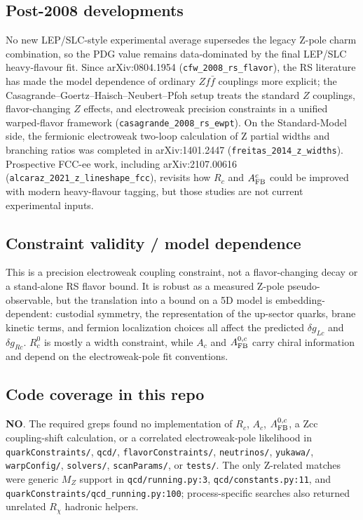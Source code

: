 \subsection*{Post-2008 developments}
No new LEP/SLC-style experimental average supersedes the legacy Z-pole charm
combination, so the PDG value remains data-dominated by the final LEP/SLC
heavy-flavour fit.  Since arXiv:0804.1954 (\texttt{cfw\_2008\_rs\_flavor}),
the RS literature has made the model dependence of ordinary \(Zf\bar f\)
couplings more explicit; the Casagrande--Goertz--Haisch--Neubert--Pfoh setup
treats the standard \(Z\) couplings, flavor-changing \(Z\) effects, and
electroweak precision constraints in a unified warped-flavor framework
(\texttt{casagrande\_2008\_rs\_ewpt}).  On the Standard-Model side, the
fermionic electroweak two-loop calculation of Z partial widths and branching
ratios was completed in arXiv:1401.2447
(\texttt{freitas\_2014\_z\_widths}).  Prospective FCC-ee work, including
arXiv:2107.00616 (\texttt{alcaraz\_2021\_z\_lineshape\_fcc}), revisits how
\(R_c\) and \(A_{\rm FB}^{c}\) could be improved with modern heavy-flavour
tagging, but those studies are not current experimental inputs.

\subsection*{Constraint validity / model dependence}
This is a precision electroweak coupling constraint, not a flavor-changing
decay or a stand-alone RS flavor bound.  It is robust as a measured Z-pole
pseudo-observable, but the translation into a bound on a 5D model is
embedding-dependent: custodial symmetry, the representation of the up-sector
quarks, brane kinetic terms, and fermion localization choices all affect the
predicted \(\delta g_{Lc}\) and \(\delta g_{Rc}\).  \(R_c^0\) is mostly a width
constraint, while \(A_c\) and \(A_{\rm FB}^{0,c}\) carry chiral information and
depend on the electroweak-pole fit conventions.

\subsection*{Code coverage in this repo}
\textbf{NO}.  The required greps found no implementation of \(R_c\), \(A_c\),
\(A_{\rm FB}^{0,c}\), a Zcc coupling-shift calculation, or a correlated
electroweak-pole likelihood in \texttt{quarkConstraints/}, \texttt{qcd/},
\texttt{flavorConstraints/}, \texttt{neutrinos/}, \texttt{yukawa/},
\texttt{warpConfig/}, \texttt{solvers/}, \texttt{scanParams/}, or
\texttt{tests/}.  The only Z-related matches were generic \(M_Z\) support in
\texttt{qcd/running.py:3}, \texttt{qcd/constants.py:11}, and
\texttt{quarkConstraints/qcd\_running.py:100}; process-specific searches also
returned unrelated \(R_\chi\) hadronic helpers.

